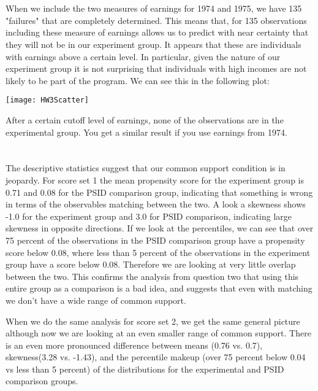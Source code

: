 \documentclass[11pt]{article}
\theoremstyle{definition}
\begin{document}
\section{}
When we include the two measures of earnings for 1974 and 1975, we have 135 "failures" that are completely determined.  This means that, for 135 observations including these measure of earnings allows us to predict with near certainty that they will not be in our experiment group.  It appears that these are individuals with earnings above a certain level.  In particular, given the nature of our experiment group it is not surprising that individuals with high incomes are not likely to be part of the program.  We can see this in the following plot:
\begin{center}
\texttt{[image: HW3Scatter]}
\end{center}

After a certain cutoff level of earnings, none of the observations are in the experimental group. You get a similar result if you use earnings from 1974.


\section{}
The descriptive statistics suggest that our common support condition is in jeopardy.  For score set 1 the mean propensity score for the experiment group is 0.71 and 0.08 for the PSID comparison group, indicating that something is wrong in terms of the observables matching between the two.  A look a skewness shows -1.0 for the experiment group and 3.0 for PSID comparison, indicating large skewness in opposite directions.  If we look at the percentiles, we can see that over 75 percent of the observations in the PSID comparison group have a propensity score below 0.08, where less than 5 percent of the observations in the experiment group have a score below 0.08.  Therefore we are looking at very little overlap between the two.  This confirms the analysis from question two that using this entire group as a comparison is a bad idea, and suggests that even with matching we don't have a wide range of common support.

When we do the same analysis for score set 2, we get the same general picture although now we are looking at an even smaller range of common support.  There is an even more pronounced difference between means (0.76 vs. 0.7), skewness(3.28 vs. -1.43), and the percentile makeup (over 75 percent below 0.04 vs less than 5 percent) of the distributions for the experimental and PSID comparison groups.  
\end{document}
